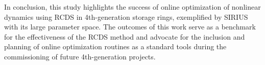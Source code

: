 In conclusion, this study highlights the success of online optimization of nonlinear dynamics using RCDS in 4th-generation storage rings, exemplified by SIRIUS with its large parameter space. The outcomes of this work serve as a benchmark for the effectiveness of the RCDS method and advocate for the inclusion and planning of online optimization routines as a standard tools during the commissioning of future 4th-generation projects.
